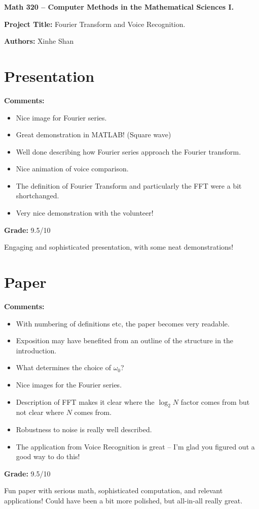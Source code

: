 \documentclass[12pt]{article}
\begin{document}
{\bf \large Math 320 -- Computer Methods in the Mathematical Sciences I.}\\

\vspace{3mm}

{\bf \large Project Title:} Fourier Transform and Voice Recognition.\\
\vspace{2mm}

{\bf \large Authors:} Xinhe Shan \\

\vspace{3mm}

\section{Presentation}
{\bf \large Comments:}
\begin{itemize}
\item Nice image for Fourier series.
\item Great demonstration in MATLAB! (Square wave)
\item Well done describing how Fourier series approach the Fourier transform.
\item Nice animation of voice comparison.
\item The definition of Fourier Transform and particularly the FFT were
a bit shortchanged.
\item Very nice demonstration with the volunteer!
\end{itemize}

{\bf \large Grade:} 9.5/10

Engaging and sophisticated presentation, with some neat demonstrations!


\section{Paper}

{\bf \large Comments:}
\begin{itemize}
\item With numbering of definitions etc, the paper becomes very readable.
\item Exposition may have benefited from an outline of the structure in the 
introduction.
\item What determines the choice of $\omega_0$?
\item Nice images for the Fourier series. 
\item Description of FFT makes it clear where the $\log_2N$ factor comes from
but not clear where $N$ comes from.
\item Robustness to noise is really well described.
\item The application from Voice Recognition is great -- I'm glad you figured out a good way to do this!
\end{itemize}

{\bf \large Grade:} 9.5/10

Fun paper with serious math, sophisticated computation, and relevant applications! Could have been a bit more polished, but all-in-all really great.
\end{document}
